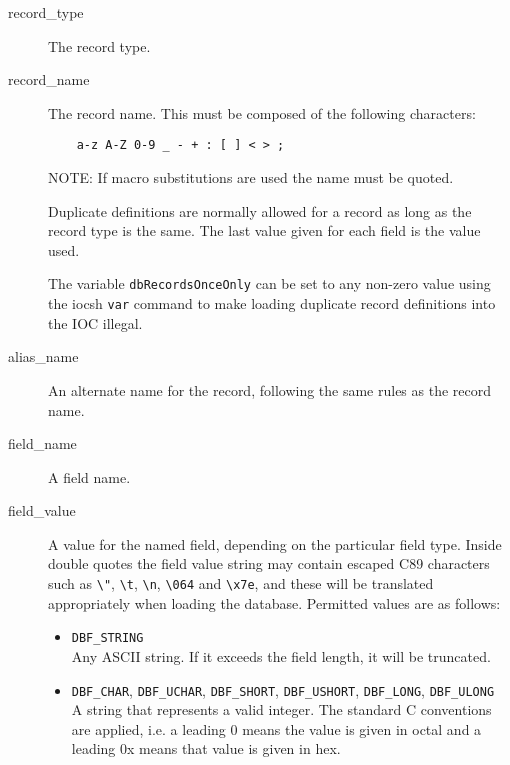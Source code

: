 \begin{description}
\item [record\_type] The record type.

\item [record\_name] The record name.
This must be composed of the following characters:

\begin{verbatim}
    a-z A-Z 0-9 _ - + : [ ] < > ;
\end{verbatim}

NOTE: If macro substitutions are used the name must be quoted.

Duplicate definitions are normally allowed for a record as long as the record type is the same.
The last value given for each field is the value used.

The variable \verb|dbRecordsOnceOnly| can be set to any non-zero value using the iocsh \verb|var| command to make loading duplicate record definitions into the IOC illegal.

\item [alias\_name] An alternate name for the record, following the same rules as the record name.

\item [field\_name] A field name.

\item [field\_value] A value for the named field, depending on the particular field type.
Inside double quotes the field value string may contain escaped C89 characters such as 
\verb|\"|, \verb|\t|, \verb|\n|, \verb|\064| and \verb|\x7e|, and these will be translated appropriately when loading the database.
Permitted values are as follows:

\begin{itemize}
\item \verb|DBF_STRING| \\
Any ASCII string. If it exceeds the field length, it will be truncated.

\item \verb|DBF_CHAR|, \verb|DBF_UCHAR|, \verb|DBF_SHORT|, \verb|DBF_USHORT|, \verb|DBF_LONG|, \verb|DBF_ULONG| \\
A string that represents a valid integer. The standard C conventions are applied, i.e. a leading 0 means the 
value is given in octal and a leading 0x means that value is given in hex.


\end{itemize}
\end{description}
